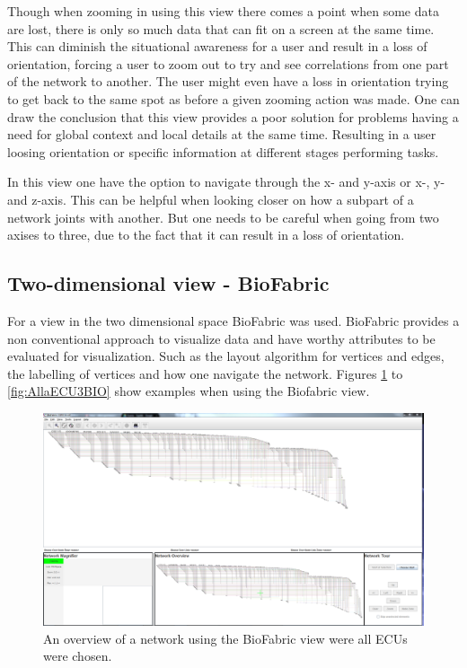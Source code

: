 \documentclass[a4paper,11pt]{kth-mag}
\begin{document}
Though when zooming in using this view there comes a point when some data are lost, there
is only so much data that can fit on a screen at the same time. This can diminish the situational awareness for a user and result in
a loss of orientation, forcing a user to zoom out to try and see correlations from one part of the network to another. The user might even have a loss in orientation trying to get back to the same spot as before a given 
zooming action was made. One can draw the conclusion that this view provides a poor solution for problems having a need for global context and local details at the same time. Resulting in a user loosing orientation or 
specific information at different stages performing tasks.

In this view one have the option to navigate through the x- and y-axis or x-, y- and z-axis. This can be helpful when looking closer on how a subpart of a network joints with another. But one needs to be careful 
when going from two axises to three, due to the fact that it can result in a loss of orientation.

\subsection{Two-dimensional view - BioFabric}
For a view in the two dimensional space BioFabric was used. BioFabric provides a non conventional approach to visualize data and have worthy attributes to be evaluated for visualization. 
Such as the layout algorithm for vertices and edges, the labelling of vertices and how one navigate the network. Figures \ref{fig:AllaECU1BIO} to \ref{fig:AllaECU3BIO} show examples when using the Biofabric view.
 
\begin{figure}[!htbp]
	\centering
	\includegraphics[scale=0.3]{SesammVisualAppPics/BioFabric/Undirected/ECU/AllaECU1}
	\caption{An overview of a network using the BioFabric view were all ECUs were chosen.}
	\label{fig:AllaECU1BIO}
\end{figure}
\end{document}
